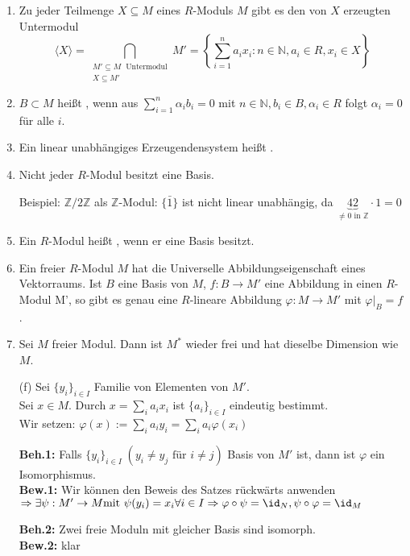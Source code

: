 \begin{Bem}
  \begin{enumerate}
    \item Zu jeder Teilmenge $X \subseteq M$ eines $R$-Moduls $M$ gibt es den von
          $X$ erzeugten Untermodul $$\langle X \rangle = \displaystyle 
          \bigcap_{\substack{M' \subseteq M\; \text{ Untermodul} \\ X \subseteq M'}} M' = \left\{
          \sum_{i=1}^n a_i x_i: n \in \mathbb{N}, a_i \in R, x_i \in X \right\}$$
    \item $B \subset M$ heißt ,
          wenn aus $\displaystyle \sum_{i=1}^n \alpha_i b_i = 0$ mit $n \in
          \mathbb{N}, b_i \in B, \alpha_i \in R$ folgt $\alpha_i = 0$ für alle
          $i$.
    \item Ein linear unabhängiges Erzeugendensystem heißt
          .
    \item Nicht jeder $R$-Modul besitzt eine Basis.

          Beispiel: $\mathbb{Z}/2\mathbb{Z}$ als $\mathbb{Z}$-Modul: $\{\bar{1}\}$
          ist nicht linear unabhängig, da $\underbrace{42}_{\not= 0 \text{ in } \mathbb{Z}} \cdot 1 = 0$
    \item Ein $R$-Modul heißt , wenn er eine
          Basis besitzt.
    \item Ein freier $R$-Modul $M$ hat die Universelle Abbildungseigenschaft eines Vektorraums. Ist $B$ eine
          Basis von $M$, $f: B \to M'$ eine Abbildung in einen $R$-Modul M', so
          gibt es genau eine $R$-lineare Abbildung $\varphi: M \to M'$ mit
          $\varphi|_B = f$.
    \item Sei $M$ freier Modul. Dann ist $M^*$ wieder frei und hat dieselbe
          Dimension wie $M$.
  \end{enumerate}
\end{Bem}

\begin{Bew}
  \begin{enumerate}
    \item[(f)] Sei $\{y_i\}_{i \in I}$ Familie von Elementen von $M'$.\\
			   Sei $x \in M$. Durch $x=\sum_{i}a_ix_i$ ist $\{a_i\}_{i  \in I}$
			   eindeutig bestimmt.\\
			   Wir setzen: $\varphi(x):=\sum_i a_iy_i=\sum_ia_i\varphi(x_i)$

			   \textbf{Beh.1:} Falls $\{y_i\}_{i\in I}\;(y_i \neq y_j \mbox{ für } i\neq
			   j)$ Basis von $M'$ ist, dann ist $\varphi$ ein Isomorphismus.\\
			   \textbf{Bew.1:} Wir können den Beweis des Satzes rückwärts anwenden $\Rightarrow \exists \psi:
			   M' \rightarrow M \text{mit } \psi(y_i)=x_i \forall i \in I \Rightarrow
			   \varphi \circ \psi = \id_N, \psi \circ \varphi = \id_M$

   			   \textbf{Beh.2:} Zwei freie Moduln mit gleicher Basis sind
  			   isomorph.\\
  			   \textbf{Bew.2:} klar
  \end{enumerate}
\end{Bew}


